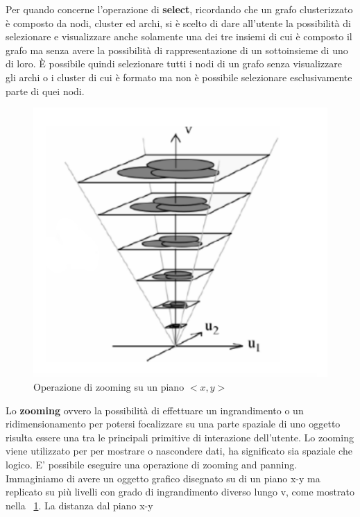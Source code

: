 {Per quando concerne l'operazione di \textbf{select}, ricordando che un grafo clusterizzato è composto da nodi, cluster ed archi, si è scelto di dare all'utente la possibilità di selezionare e visualizzare anche solamente una dei tre insiemi di cui è composto il grafo ma senza avere la possibilità di rappresentazione di un sottoinsieme di uno di loro. È possibile quindi selezionare tutti i nodi di un grafo senza visualizzare gli archi o i cluster di cui è formato ma non è possibile selezionare esclusivamente parte di quei nodi.\\
\begin{figure}[!htb]
	\begin{center}
		\includegraphics[width=1 \linewidth]{figure/zooming}
	\end{center}
	\caption{Operazione di zooming su un piano $<x,y>$\label{fig:zooming}}
\end{figure}
Lo \textbf{zooming} ovvero la possibilità di effettuare un ingrandimento o un ridimensionamento per potersi focalizzare su una parte spaziale di uno oggetto risulta essere una tra le principali primitive di interazione dell'utente. Lo zooming viene utilizzato per per mostrare o nascondere dati, ha significato sia spaziale che logico. E’ possibile eseguire una operazione di zooming and panning. Immaginiamo di avere un oggetto grafico disegnato su di un piano x-y ma replicato su più livelli con grado di ingrandimento diverso lungo v, come mostrato nella \figurename~\ref{fig:zooming}. La distanza dal piano x-y
}
